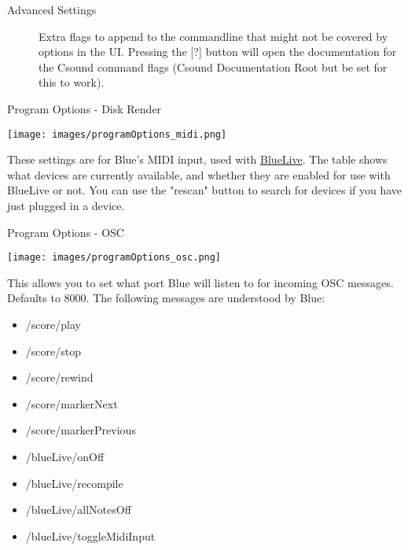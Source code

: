 \begin{description}
\item[Advanced Settings]
Extra flags to append to the commandline that might not be covered by
options in the UI. Pressing the {[}?{]} button will open the
documentation for the Csound command flags (Csound Documentation Root
but be set for this to work).
\end{description}

Program Options - Disk Render

\texttt{[image: images/programOptions\_midi.png]}

These settings are for Blue's MIDI input, used with
\protect\hyperlink{blueLive}{BlueLive}. The table shows what devices are
currently available, and whether they are enabled for use with BlueLive
or not. You can use the "rescan" button to search for devices if you
have just plugged in a device.

Program Options - OSC

\texttt{[image: images/programOptions\_osc.png]}

This allows you to set what port Blue will listen to for incoming OSC
messages. Defaults to 8000. The following messages are understood by
Blue:

\begin{itemize}
\item
  /score/play
\item
  /score/stop
\item
  /score/rewind
\item
  /score/markerNext
\item
  /score/markerPrevious
\item
  /blueLive/onOff
\item
  /blueLive/recompile
\item
  /blueLive/allNotesOff
\item
  /blueLive/toggleMidiInput
\end{itemize}
